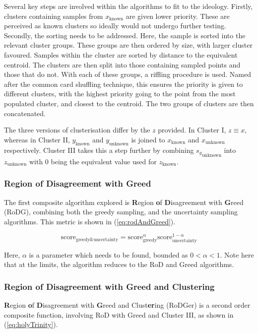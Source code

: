 Several key steps are involved within the algorithms to fit to the ideology. Firstly, clusters containing samples from $x_\mathrm{known}$ are given lower priority. These are perceived as known clusters so ideally would not undergo further testing. Secondly, the sorting needs to be addressed. Here, the sample is sorted into the relevant cluster groups. These groups are then ordered by size, with larger cluster favoured. Samples within the cluster are sorted by distance to the equivalent centroid. The clusters are then split into those containing sampled points and those that do not. With each of these groups, a riffling procedure is used. Named after the common card shuffling technique, this ensures the priority is given to different clusters, with the highest priority going to the point from the most populated cluster, and closest to the centroid. The two groups of clusters are then concatenated.

The three versions of clusterisation differ by the $z$ provided. In Cluster I, $z\equiv{}x$, whereas in Cluster II, $y_\mathrm{known}$ and $y_\mathrm{unknown}$ is joined to $x_\mathrm{known}$ and $x_\mathrm{unknown}$ respectively. Cluster III takes this a step further by combining ${s_g}_\mathrm{unknown}$ into $z_\mathrm{unknown}$ with 0 being the equivalent value used for $z_\mathrm{known}$.

\subsubsection{Region of Disagreement with Greed}
The first composite algorithm explored is \textbf{R}egion \textbf{o}f \textbf{D}isagreement with \textbf{G}reed (RoDG), combining both the greedy sampling, and the uncertainty sampling algorithms. This metric is shown in (\ref{eq:rodAndGreed}).

\begin{equation}
    \label{eq:rodAndGreed}
    {\mathrm{score}_\mathrm{greedy\&uncertainty}=\mathrm{score}_\mathrm{greedy}^{\alpha}\mathrm{score}_\mathrm{uncertainty}^{1-\alpha}}
\end{equation}

Here, $\alpha$ is a parameter which needs to be found, bounded as $0<\alpha{}<1$. Note here that at the limits, the algorithm reduces to the RoD and Greed algorithms.

\subsubsection{Region of Disagreement with Greed and Clustering}
\textbf{R}egion \textbf{o}f \textbf{D}isagreement with \textbf{G}reed and Clust\textbf{er}ing (RoDGer) is a second order composite function, involving RoD with Greed and Cluster III, as shown in (\ref{eq:holyTrinity}).

